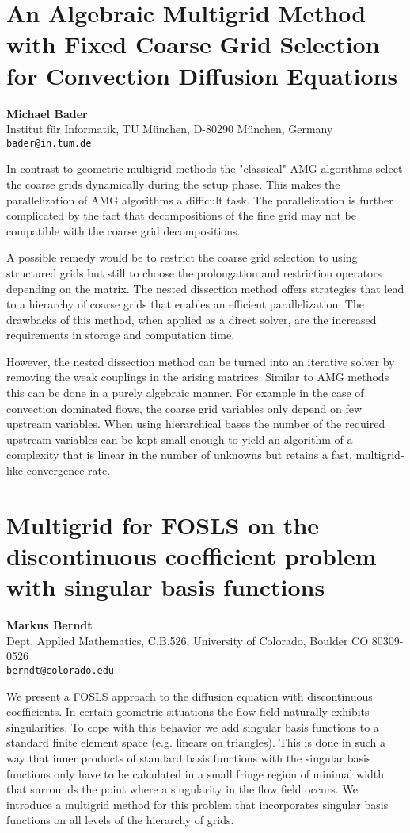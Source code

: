 \documentclass[11pt]{article}
\newcommand{\nextab}[4]{
	\section{#2}
	{\bf #1} \\ \nopagebreak
	{#3} \\ \nopagebreak
	{\tt #4} \nopagebreak
	}
\begin{document}

\nextab{Michael Bader}
	{An Algebraic Multigrid Method with Fixed Coarse Grid
	Selection for Convection Diffusion Equations}
	{Institut f\"ur Informatik,
	TU M\"unchen,
	D-80290 M\"unchen,
	Germany}
	{bader@in.tum.de}

In contrast to geometric multigrid methods the "classical" AMG
algorithms
select the coarse grids dynamically during the setup phase.
This makes the parallelization of AMG algorithms a difficult task.
The parallelization is further complicated by the fact that
decompositions
of the fine grid may not be compatible with the coarse grid
decompositions.

A possible remedy would be to restrict the coarse grid selection to
using structured grids but still to choose the prolongation and
restriction operators depending on the matrix.
The nested dissection method offers strategies that lead to a
hierarchy of coarse grids that enables an efficient parallelization.
The drawbacks of this method, when applied as a direct solver, are the
increased requirements in storage and computation time.

However, the nested dissection method can be turned into an iterative
solver by removing the weak couplings in the arising matrices.
Similar to AMG methods this can be done in a purely algebraic manner.
For example in the case of convection dominated flows, the coarse grid
variables only depend on few upstream variables.
When using hierarchical bases the number of the required upstream
variables can be kept small enough to yield an algorithm of a complexity
that is linear in the number of unknowns but retains a fast,
multigrid-like convergence rate.




\nextab{Markus Berndt}
	{Multigrid for FOSLS on the discontinuous coefficient problem
	with singular basis functions}
	{Dept. Applied Mathematics, C.B.526,
		University of Colorado, Boulder CO 80309-0526}
	{berndt@colorado.edu}

We present a FOSLS approach to the diffusion equation with discontinuous
coefficients. In certain geometric situations the flow field naturally
exhibits singularities. To cope with this behavior we add singular basis
functions to a standard finite element space (e.g. linears on triangles).
This is done in such a way that inner products of standard basis functions
with the singular basis functions only have to be calculated in a small
fringe region of minimal width that surrounds the point where a singularity
in the flow field occurs. We introduce a multigrid method for this problem
that incorporates singular basis functions on all levels of the hierarchy
of grids.
\end{document}
